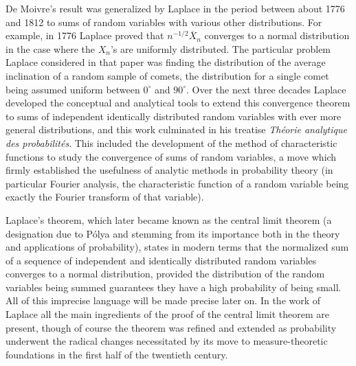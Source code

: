 \documentclass{article}
\theoremstyle{definition}
\begin{document}
De Moivre's result was generalized by Laplace in the period between about 1776 and 1812 to sums of random variables with various other distributions. For example, in 1776 Laplace proved that $n^{-1/2} \overline X_n$ converges to a normal distribution in the case where the $X_n$'s are uniformly distributed. The particular problem Laplace considered in that paper was finding the distribution of the average inclination of a random sample of comets, the distribution for a single comet being assumed uniform between $0^\circ$ and $90^\circ$. Over the next three decades Laplace developed the conceptual and analytical tools to extend this convergence theorem to sums of independent identically distributed random variables with ever more general distributions, and this work culminated in his treatise {\em Th\'eorie analytique des probabilit\'es}. This included the development of the method of characteristic functions to study the convergence of sums of random variables, a move which firmly established the usefulness of analytic methods in probability theory (in particular Fourier analysis, the characteristic function of a random variable being exactly the Fourier transform of that variable).

Laplace's theorem, which later became known as the central limit theorem (a designation due to P\'olya and stemming from its importance both in the theory and applications of probability), states in modern terms that the normalized sum of a sequence of independent and identically distributed random variables converges to a normal distribution, provided the distribution of the random variables being summed guarantees they have a high probability of being small. All of this imprecise language will be made precise later on. In the work of Laplace all the main ingredients of the proof of the central limit theorem are present, though of course the theorem was refined and extended as probability underwent the radical changes necessitated by its move to measure-theoretic foundations in the first half of the twentieth century.
\end{document}
